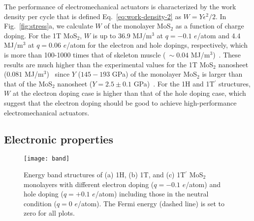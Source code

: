 \documentclass[12pt]{iopart}
\begin{document}
The performance of electromechanical actuators is characterized by the
work density per cycle that is defined Eq.~\ref{eq:work-density-2}
as $W=Y\epsilon^2/2$. In Fig.~\ref{fig:stress}a, we calculate $W$ of
the monolayer MoS$_2$ as a function of charge doping.  For the 1T
MoS$_2$, $W$ is up to 36.9 MJ/m$^{3}$ at $q=-0.1$ $e$/atom and 4.4
MJ/m$^{3}$ at $q=0.06$ $e$/atom for the electron and hole dopings,
respectively, which is more than 100-1000 times that of skeleton
muscle ($~\sim 0.04$ MJ/m$^{3}$)~\cite{madden2004artificial}.  These
results are much higher than the experimental values for the 1T
MoS$_2$ nanosheet ($0.081$ MJ/m$^{3}$)~\cite{acerce2017metallic} since
$Y$ ($145-193$ GPa) of the monolayer MoS$_2$ is larger than that of
the MoS$_2$ nanosheet ($Y=2.5\pm0.1$ GPa)~\cite{acerce2017metallic}.
For the 1H and 1T$^\prime$ structures, $W$ at the electron doping case
is higher than that of the hole doping case, which suggest that the
electron doping should be good to achieve high-performance
electromechanical actuators.

\subsection{Electronic properties}

\begin{figure}[t!]
  \centering \texttt{[image: band]}
  \caption{\label{fig:bands}Energy band structures of (a) 1H, (b) 1T,
    and (c) 1T$^\prime$ MoS$_2$ monolayers with different electron
    doping ($q=-0.1$ $e$/atom) and hole doping ($q=+0.1$ $e$/atom)
    including those in the neutral condition ($q=0$ $e$/atom).  The
    Fermi energy (dashed line) is set to zero for all plots.}
\end{figure}
\end{document}
